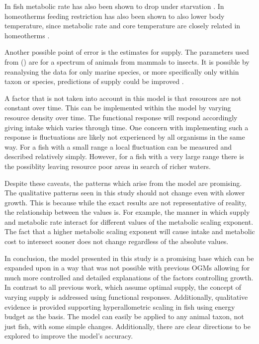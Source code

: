 \documentclass[a4paper, 11pt, hidelinks]{article} %
\begin{document}
	In fish metabolic rate has also been shown to drop under starvation \parencite{Cook2000}.  In homeotherms feeding restriction has also been shown to also lower body temperature, since metabolic rate and core temperature are closely related in homeotherms \parencite{Ballor1991, Blanc2003,}.  
	
	Another possible point of error is the estimates for supply.  The parameters used from \citeauthor{Pawar2012} (\citeyear{Pawar2012}) are for a spectrum of animals from mammals to insects.  It is possible by reanalysing the data for only marine species, or more specifically only within taxon or species, predictions of supply could be improved \parencite{Marshall2019}.  %
	
	A factor that is not taken into account in this model is that resources are not constant over time.  This can be implemented within the model by varying resource density over time.  The functional response will respond accordingly giving intake which varies through time.  One concern with implementing such a response is fluctuations are likely not experienced by all organisms in the same way.  For a fish with a small range a local fluctuation can be measured and described relatively simply.  However, for a fish with a very large range there is the possiblity leaving resource poor areas in search of richer waters.
	
	
	Despite these caveats, the patterns which arise from the model are promising.  The qualitative patterns seen in this study should not change even with slower growth.  This is because while the exact results are not representative of reality, the relationship between the values is.  For example, the manner in which supply and metabolic rate interact for different values of the metabolic scaling exponent.  The fact that a higher metabolic scaling exponent will cause intake and metabolic cost to intersect sooner does not change regardless of the absolute values.
	
 
	
	
	
	
	In conclusion, the model presented in this study is a promising base which can be expanded upon in a way that was not possible with previous OGMs allowing for much more controlled and detailed explanations of the factors controlling growth.  In contrast to all previous work, which assume optimal supply, the concept of varying supply is addressed using functional responses.  Additionally, qualitative evidence is provided supporting hyperallometric scaling in fish using energy budget as the basis.  The model can easily be applied to any animal taxon, not just fish, with some simple changes.  Additionally, there are clear directions to be explored to improve the model's accuracy.
	
\end{document}
